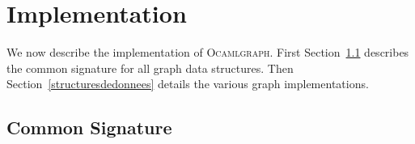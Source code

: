 \documentclass[tfpsymp]{tfp05symp}
\newcommand{\ocamlgraph}{\textsc{Ocamlgraph}\xspace}
\begin{document}

\section{Implementation}\label{implementation}

We now describe the implementation of
\ocamlgraph. First Section~\ref{interface} describes the common
signature for all graph data structures.
Then Section~\ref{structuresdedonnees} details the various graph
implementations.

\subsection{Common Signature}\label{interface}
\end{document}

